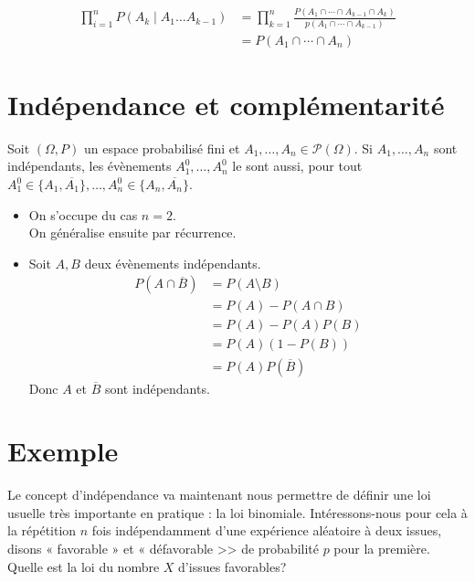 \documentclass[../main.tex]{subfiles}
\begin{document}
\begin{align*}
    \prod_{i=1}^{n} P(A_k\mid A_1\ldots A_{k-1}) &= \prod_{k=1}^{n} \frac{P(A_1 \cap \cdots \cap A_{k-1}\cap A_k)}{p(A_1\cap \cdots\cap A_{k-1})} \\
    &= P(A_1\cap \cdots \cap A_n)
\end{align*}

\section{Indépendance et complémentarité}
\begin{tcolorbox}[title=Théorème 32.43, title filled=false, colframe=orange, colback=orange!10!white]
    Soit $(\Omega, P)$ un espace probabilisé fini et $A_1, \ldots, A_n\in \mathcal{P}(\Omega)$. Si $A_1, \ldots, A_n$ sont indépendants, les évènements $A_1^0, \ldots, A_n^0$ le sont aussi, pour tout $A_1^0\in \{A_1, \overline{A_1}\}, \ldots, A_n^0\in \{A_n, \overline{A_n}\}$. 
\end{tcolorbox}

\begin{itemize}
    \item On s'occupe du cas $n=2$. \\
    On généralise ensuite par récurrence. 
    \item Soit $A, B$ deux évènements indépendants. \\
    \begin{align*}
        P(A\cap \overline{B}) &= P(A\setminus B) \\
        &= P(A) - P(A\cap B) \\
        &= P(A) - P(A)P(B) \\
        &= P(A)(1 - P(B)) \\
        &= P(A)P(\overline{B})
    \end{align*}
    Donc $A$ et $\overline{B}$ sont indépendants. 
\end{itemize}

\section{Exemple}
\begin{tcolorbox}[title=Exemple 32.44, title filled=false, colframe=darkgreen, colback=darkgreen!10!white]
    Le concept d'indépendance va maintenant nous permettre de définir une loi usuelle très importante en pratique : la loi binomiale. Intéressons-nous pour cela à la répétition $n$ fois indépendamment d'une expérience aléatoire à deux issues, disons « favorable » et « défavorable >> de probabilité $p$ pour la première. Quelle est la loi du nombre $X$ d'issues favorables?
\end{tcolorbox}
\end{document}
